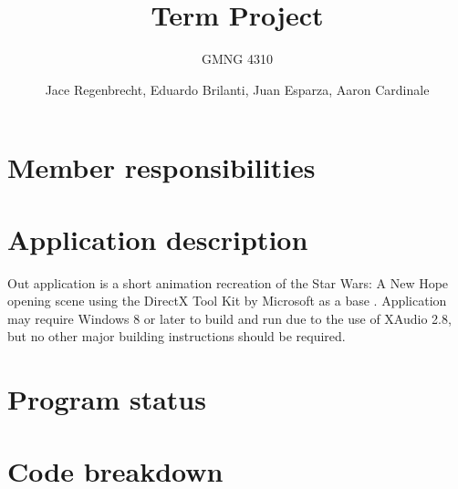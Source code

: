 \documentclass[a4paper]{scrartcl}
\title{Term Project}
\subtitle{GMNG 4310}
\author{Jace Regenbrecht, Eduardo Brilanti, Juan Esparza, Aaron Cardinale}
\begin{document}
\maketitle

\section{Member responsibilities}

\section{Application description}

Out application is a short animation recreation of the Star Wars: A New Hope opening scene using the DirectX Tool Kit by Microsoft as a base \cite{directxtk}. Application may require Windows 8 or later to build and run due to the use of XAudio 2.8, but no other major building instructions should be required.


\section{Program status}

\section{Code breakdown}



\end{document}
